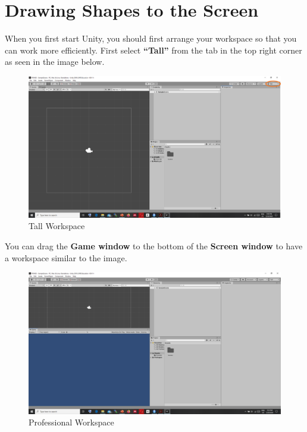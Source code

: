 \documentclass[
]{book}
\begin{document}
\hypertarget{drawing-shapes-to-the-screen}{%
\section{Drawing Shapes to the Screen}\label{drawing-shapes-to-the-screen}}

When you first start Unity, you should first arrange your workspace so that you can work more efficiently. First select \textbf{``Tall''} from the tab in the top right corner as seen in the image below.

\begin{figure}
\centering
\includegraphics{Images/Setting.png}
\caption{Tall Workspace}
\end{figure}

You can drag the \textbf{Game window} to the bottom of the \textbf{Screen window} to have a workspace similar to the image.

\begin{figure}
\centering
\includegraphics{Images/Setting2.png}
\caption{Professional Workspace}
\end{figure}
\end{document}
